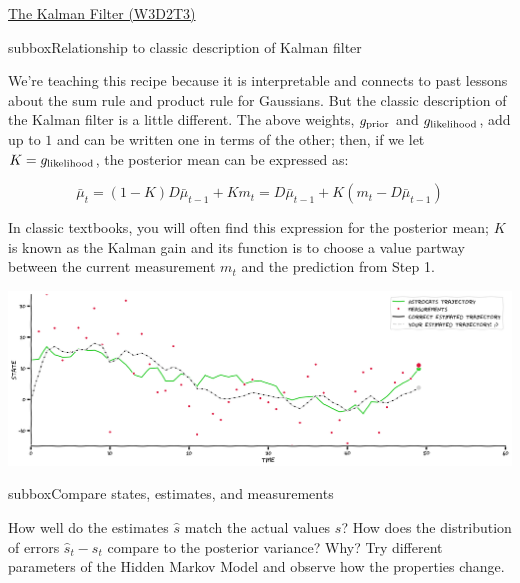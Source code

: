 \begin{textbox}{\href{http://instructor.compneuro.neuromatch.io/tutorials/W3D2_HiddenDynamics/instructor/W3D2_Tutorial3.html}{The Kalman Filter (W3D2T3)}   }

\begin{subbox}{subbox}{Relationship to classic description of Kalman filter}
\scriptsize

We're teaching this recipe because it is interpretable and connects to past lessons about the sum rule and product rule for Gaussians. But the classic description of the Kalman filter is a little different. The above weights, $g_{\rm{prior}}$ and $g_{\rm{likelihood}}$, add up to $1$ and can be written one in terms of the other; then, if we let $K = g_{\rm{likelihood}}$, the posterior mean can be expressed as:

\begin{equation}
\bar{\mu}_t = (1-K) D\bar{\mu}_{t-1} + K m_t = D\bar{\mu}_{t-1} + K (m_t - D\bar{\mu}_{t-1})
\end{equation}

In classic textbooks, you will often find this expression for the posterior mean; $K$ is known as the Kalman gain and its function is to choose a value partway between the current measurement $m_t$ and the prediction from Step 1.


\begin{center}
    
\includegraphics[scale=0.17]{Figures/HD/HD_Figure7.png}
\end{center}

\end{subbox}
\begin{subbox}{subbox}{Compare states, estimates, and measurements}
\scriptsize

How well do the estimates $\hat{s}$ match the actual values $s$? How does the distribution of errors $\hat{s}_t - s_t$ compare to the posterior variance? Why? Try different parameters of the Hidden Markov Model and observe how the properties change.


\end{subbox}
\end{textbox}
